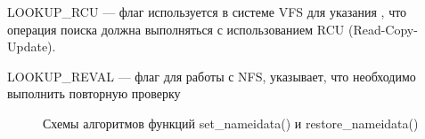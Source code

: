 \FloatBarrier

LOOKUP\_RCU --- флаг используется в системе VFS для указания , что операция
поиска должна выполняться с использованием RCU (Read-Copy-Update).

LOOKUP\_REVAL --- флаг для работы с NFS, указывает, что необходимо выполнить повторную проверку


\begin{figure}[H]
	\caption{Схемы алгоритмов функций set\_nameidata() и restore\_nameidata()}
\end{figure}

